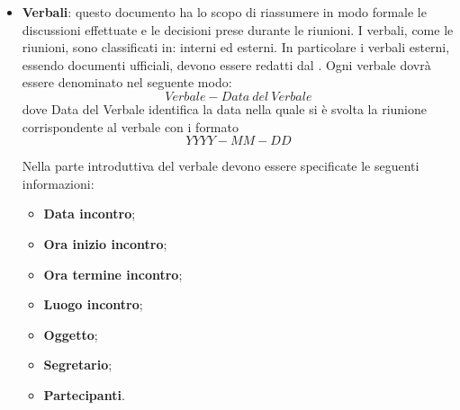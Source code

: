 \documentclass[../NormeDiProgetto_v4.0.0.tex]{subfiles}
\begin{document}
\begin{itemize}
				\item \textbf{Verbali}: questo documento ha lo scopo di riassumere in modo formale le discussioni effettuate e le decisioni prese durante le riunioni. I verbali, come le riunioni, sono classificati in: interni ed esterni. In particolare i verbali esterni, essendo documenti ufficiali, devono essere redatti dal \responsabilediprogetto.
				Ogni verbale dovrà essere denominato nel seguente modo:
				\begin{equation*}
					Verbale-Data\ del\ Verbale
				\end{equation*}
				dove Data del Verbale identifica la data nella quale si è svolta la riunione corrispondente al verbale con i formato
				\begin{equation*}
					YYYY-MM-DD
				\end{equation*}

				Nella parte introduttiva del verbale devono essere specificate le seguenti informazioni:
					\begin{itemize}
					\item \textbf{Data incontro};
					\item \textbf{Ora inizio incontro};
					\item \textbf{Ora termine incontro};
					\item \textbf{Luogo incontro};
					\item \textbf{Oggetto};
					\item \textbf{Segretario};
					\item \textbf{Partecipanti}.
					\end{itemize}
				\end{itemize}
			
\end{document}
